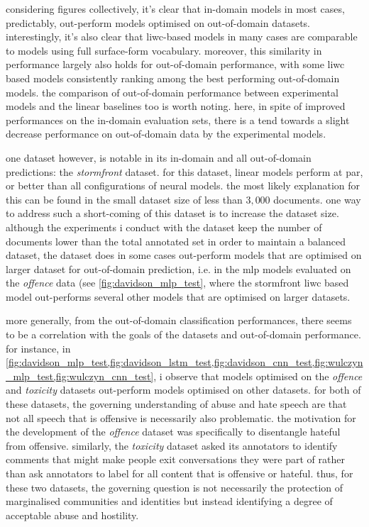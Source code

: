 considering figures collectively, it's clear that in-domain models in most cases, predictably, out-perform models optimised on out-of-domain datasets.
interestingly, it's also clear that liwc-based models in many cases are comparable to models using full surface-form vocabulary.
moreover, this similarity in performance largely also holds for out-of-domain performance, with some liwc based models consistently ranking among the best performing out-of-domain models.
the comparison of out-of-domain performance between experimental models and the linear baselines too is worth noting.
here, in spite of improved performances on the in-domain evaluation sets, there is a tend towards a slight decrease performance on out-of-domain data by the experimental models.

one dataset however, is notable in its in-domain and all out-of-domain predictions: the \textit{stormfront} dataset. 
for this dataset, linear models perform at par, or better than all configurations of neural models.
the most likely explanation for this can be found in the small dataset size of less than $3,000$ documents.
one way to address such a short-coming of this dataset is to increase the dataset size. 
although the experiments i conduct with the dataset keep the number of documents lower than the total annotated set in order to maintain a balanced dataset, the dataset does in some cases out-perform models that are optimised on larger dataset for out-of-domain prediction, i.e. in the mlp models evaluated on the \textit{offence} data (see \cref{fig:davidson_mlp_test}, where the stormfront liwc based model  out-performs several other models that are optimised on larger datasets.

more generally, from the out-of-domain classification performances, there seems to be a correlation with the goals of the datasets and out-of-domain performance.
for instance, in \cref{fig:davidson_mlp_test,fig:davidson_lstm_test,fig:davidson_cnn_test,fig:wulczyn_mlp_test,fig:wulczyn_cnn_test}, i observe that models optimised on the \textit{offence} and \textit{toxicity} datasets out-perform models optimised on other datasets.
for both of these datasets, the governing understanding of abuse and hate speech are that not all speech that is offensive is necessarily also problematic.
the motivation for the development of the \textit{offence} dataset was specifically to disentangle hateful from offensive.
similarly, the \textit{toxicity} dataset asked its annotators to identify comments that might make people exit conversations they were part of rather than ask annotators to label for all content that is offensive or hateful.
thus, for these two datasets, the governing question is not necessarily the protection of marginalised communities and identities but instead identifying a degree of acceptable abuse and hostility.

